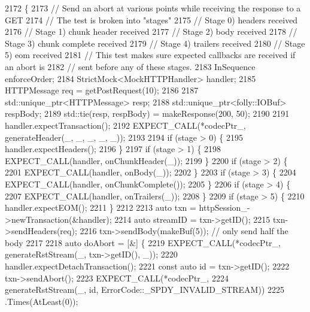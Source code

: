 \begin{DoxyCode}
2172                      \{
2173     \textcolor{comment}{// Send an abort at various points while receiving the response to a GET}
2174     \textcolor{comment}{// The test is broken into "stages"}
2175     \textcolor{comment}{// Stage 0) headers received}
2176     \textcolor{comment}{// Stage 1) chunk header received}
2177     \textcolor{comment}{// Stage 2) body received}
2178     \textcolor{comment}{// Stage 3) chunk complete received}
2179     \textcolor{comment}{// Stage 4) trailers received}
2180     \textcolor{comment}{// Stage 5) eom received}
2181     \textcolor{comment}{// This test makes sure expected callbacks are received if an abort is}
2182     \textcolor{comment}{// sent before any of these stages.}
2183     InSequence enforceOrder;
2184     StrictMock<MockHTTPHandler> handler;
2185     HTTPMessage req = getPostRequest(10);
2186 
2187     std::unique\_ptr<HTTPMessage> resp;
2188     std::unique\_ptr<folly::IOBuf> respBody;
2189     std::tie(resp, respBody) = makeResponse(200, 50);
2190 
2191     handler.expectTransaction();
2192     EXPECT\_CALL(*codecPtr_, generateHeader(\_, \_, \_, \_, \_));
2193 
2194     \textcolor{keywordflow}{if} (stage > 0) \{
2195       handler.expectHeaders();
2196     \}
2197     \textcolor{keywordflow}{if} (stage > 1) \{
2198       EXPECT\_CALL(handler, onChunkHeader(\_));
2199     \}
2200     \textcolor{keywordflow}{if} (stage > 2) \{
2201       EXPECT\_CALL(handler, onBody(\_));
2202     \}
2203     \textcolor{keywordflow}{if} (stage > 3) \{
2204       EXPECT\_CALL(handler, onChunkComplete());
2205     \}
2206     \textcolor{keywordflow}{if} (stage > 4) \{
2207       EXPECT\_CALL(handler, onTrailers(\_));
2208     \}
2209     \textcolor{keywordflow}{if} (stage > 5) \{
2210       handler.expectEOM();
2211     \}
2212 
2213     \textcolor{keyword}{auto} txn = httpSession_->newTransaction(&handler);
2214     \textcolor{keyword}{auto} streamID = txn->getID();
2215     txn->sendHeaders(req);
2216     txn->sendBody(makeBuf(5)); \textcolor{comment}{// only send half the body}
2217 
2218     \textcolor{keyword}{auto} doAbort = [&] \{
2219       EXPECT\_CALL(*codecPtr_, generateRstStream(\_, txn->getID(), \_));
2220       handler.expectDetachTransaction();
2221       \textcolor{keyword}{const} \textcolor{keyword}{auto} \textcolor{keywordtype}{id} = txn->getID();
2222       txn->sendAbort();
2223       EXPECT\_CALL(*codecPtr_,
2224                   generateRstStream(\_, \textcolor{keywordtype}{id}, ErrorCode::\_SPDY\_INVALID\_STREAM))
2225         .Times(AtLeast(0));

\end{DoxyCode}
